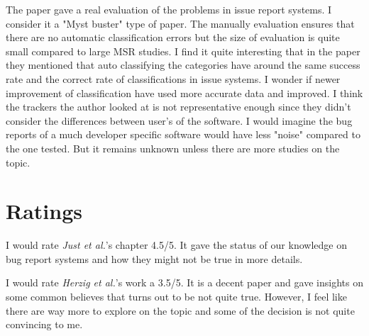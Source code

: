 \documentclass[sigconf]{acmart}
\begin{document}
The paper gave a real evaluation of the problems in issue report systems. I consider it a "Myst buster" type of paper. The manually evaluation ensures that there are no automatic classification errors but the size of evaluation is quite small compared to large MSR studies. I find it quite interesting that in the paper they mentioned that auto classifying the categories have around the same success rate and the correct rate of classifications in issue systems. I wonder if newer improvement of classification have used more accurate data and improved. I think the trackers the author looked at is not representative enough since they didn't consider the differences between user's of the software. I would imagine the bug reports of a much developer specific software would have less "noise" compared to the one tested. But it remains unknown unless there are more studies on the topic.

\section{Ratings}
I would rate {\it Just et al.}'s chapter 4.5/5. It gave the status of our knowledge on bug report systems and how they might not be true in more details.

I would rate {\it Herzig et al.}'s work a 3.5/5. It is a decent paper and gave insights on some common believes that turns out to be not quite true. However, I feel like there are way more to explore on the topic and some of the decision is not quite convincing to me.
\end{document}
